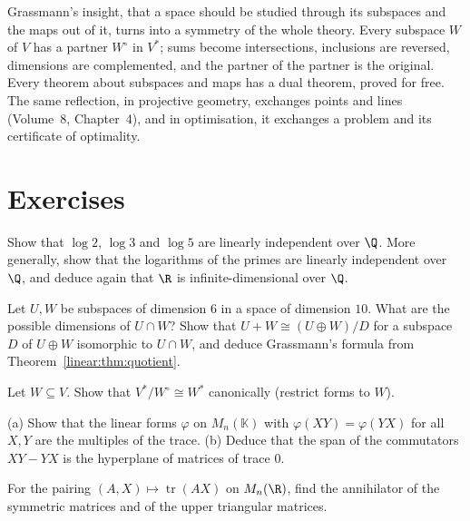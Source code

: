 \begin{beauty}
Grassmann's insight, that a space should be studied through its subspaces and the maps out of it, turns into a
symmetry of the whole theory. Every subspace $W$ of $V$ has a partner $W^\circ$ in $V^*$; sums become intersections,
inclusions are reversed, dimensions are complemented, and the partner of the partner is the original. Every theorem
about subspaces and maps has a dual theorem, proved for free. The same reflection, in projective geometry, exchanges
points and lines (Volume~8, Chapter~4), and in optimisation, it exchanges a problem and its certificate of optimality.
\end{beauty}

\section{Exercises}

\begin{exercise}[$\star$]\label{linear:ex:logs}
Show that $\log2$, $\log3$ and $\log5$ are linearly independent over $\Q$. More generally, show that the logarithms of
the primes are linearly independent over $\Q$, and deduce again that $\R$ is infinite-dimensional over $\Q$.
\end{exercise}

\begin{exercise}[$\star$]\label{linear:ex:grassmann}
Let $U,W$ be subspaces of dimension $6$ in a space of dimension $10$. What are the possible dimensions of $U\cap W$?
Show that $U+W\cong(U\oplus W)/D$ for a subspace $D$ of $U\oplus W$ isomorphic to $U\cap W$, and deduce Grassmann's
formula from Theorem~\ref{linear:thm:quotient}.
\end{exercise}

\begin{exercise}[$\star$]\label{linear:ex:quotientdual}
Let $W\subseteq V$. Show that $V^*/W^\circ\cong W^*$ canonically (restrict forms to $W$).
\end{exercise}

\begin{exercise}[$\star\star$]\label{linear:ex:traceform}
(a) Show that the linear forms $\varphi$ on $M_n(\mathbb K)$ with $\varphi(XY)=\varphi(YX)$ for all $X,Y$ are the multiples of the
trace. (b) Deduce that the span of the commutators $XY-YX$ is the hyperplane of matrices of trace $0$.
\end{exercise}

\begin{exercise}[$\star$]\label{linear:ex:symanti}
For the pairing $(A,X)\mapsto\operatorname{tr}(AX)$ on $M_n(\R)$, find the annihilator of the symmetric matrices and of the
upper triangular matrices.
\end{exercise}

